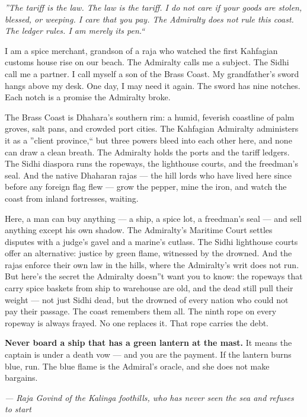 \noindent
{\Large
\textit{''The tariff is the law. The law is the tariff. I do not care if your goods are stolen, blessed, or weeping. I care that you pay. The Admiralty does not rule this coast. The ledger rules. I am merely its pen.``}

\vspace{0.5em}

I am a spice merchant, grandson of a raja who watched the first Kahfagian customs house rise on our beach. The Admiralty calls me a subject. The Sidhi call me a partner. I call myself a son of the Brass Coast. My grandfather's sword hangs above my desk. One day, I may need it again. The sword has nine notches. Each notch is a promise the Admiralty broke.

\vspace{0.5em}

The Brass Coast is Dhahara's southern rim: a humid, feverish coastline of palm groves, salt pans, and crowded port cities. The Kahfagian Admiralty administers it as a ''client province,`` but three powers bleed into each other here, and none can draw a clean breath. The Admiralty holds the ports and the tariff ledgers. The Sidhi diaspora runs the ropeways, the lighthouse courts, and the freedman's seal. And the native Dhaharan rajas --- the hill lords who have lived here since before any foreign flag flew --- grow the pepper, mine the iron, and watch the coast from inland fortresses, waiting.

\vspace{0.5em}

Here, a man can buy anything --- a ship, a spice lot, a freedman's seal --- and sell anything except his own shadow. The Admiralty's Maritime Court settles disputes with a judge's gavel and a marine's cutlass. The Sidhi lighthouse courts offer an alternative: justice by green flame, witnessed by the drowned. And the rajas enforce their own law in the hills, where the Admiralty's writ does not run. But here's the secret the Admiralty doesn''t want you to know: the ropeways that carry spice baskets from ship to warehouse are old, and the dead still pull their weight --- not just Sidhi dead, but the drowned of every nation who could not pay their passage. The coast remembers them all. The ninth rope on every ropeway is always frayed. No one replaces it. That rope carries the debt.

\vspace{0.5em}

\textbf{Never board a ship that has a green lantern at the mast.} It means the captain is under a death vow --- and you are the payment. If the lantern burns blue, run. The blue flame is the Admiral's oracle, and she does not make bargains.

\vspace{1em}

\noindent\textit{--- Raja Govind of the Kalinga foothills, who has never seen the sea and refuses to start}
}

